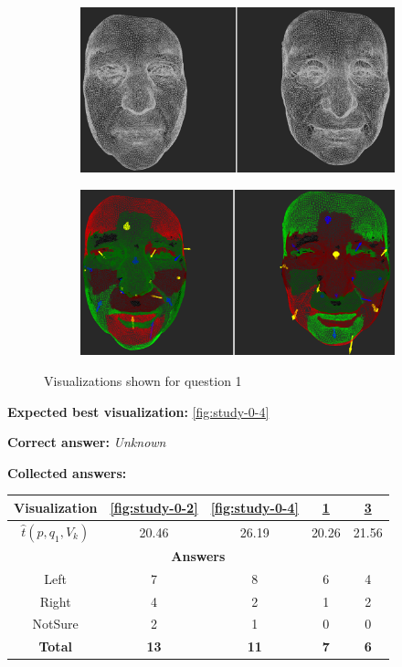 \begin{figure}[h]
\begin{subfigure}{0.4\textwidth}
\includegraphics[width=\textwidth]{./screenshots/pair1.PNG}
\caption{}
\label{fig:study-0-1}
\end{subfigure}
\quad
\begin{subfigure}{0.4\textwidth}
\includegraphics[width=\textwidth]{./screenshots/pair3.PNG}
\caption{}
\label{fig:study-0-3}
\end{subfigure}
\caption{Visualizations shown for question 1}
\end{figure}
\medskip

{\bf Expected best visualization:} \ref{fig:study-0-4}
\medskip

{\bf Correct answer:} {\it Unknown}
\medskip

{\bf Collected answers:}

\begin{center}
\begin{tabular}{| c | c | c | c | c |}
	\hline
	Visualization & \ref{fig:study-0-2} & \ref{fig:study-0-4} & \ref{fig:study-0-1} & \ref{fig:study-0-3}\\ \hline
	\(\widehat{t}(p, q_1, V_k)\) & 20.46 & 26.19 & 20.26 & 21.56\\ \hline
	\multicolumn{5}{|c|}{\bf Answers} \\ \hline
	Left & 7 & 8 & 6 & 4\\ \hline
	Right & 4 & 2 & 1 & 2\\ \hline
	NotSure & 2 & 1 & 0 & 0\\ \hline
	{\bf Total} & {\bf 13} & {\bf 11} & {\bf 7} & {\bf 6}\\ \hline
\end{tabular}
\end{center}
\clearpage

